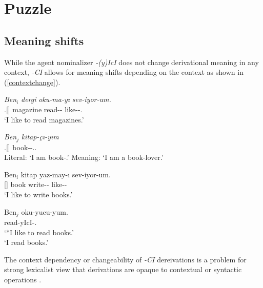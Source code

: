 \section{Puzzle}
    \subsection{Meaning shifts}
    While the agent nominalizer \textit{-(y)IcI} does not change derivational meaning in any context, \textit{-CI} allows for meaning shifts depending on the context as shown in (\ref{contextchange}).
    
    \begin{exe}
    \ex \label{contextchange}
    \begin{xlisti}
    \ex \begin{xlista}
    \ex \label{speakerA} \gll \textit{Ben}$_i$ \textit{dergi} \textit{oku-ma-yı} \textit{sev-iyor-um.} \\ {\First}.{\Sg}[{\Nom}] magazine read-{\Nmlz}-{\Acc} like-{\Prog}-{\First}.{\Sg} \\
    \glt `I like to read magazines.'

    \ex \label{speakerB} \gll \textit{Ben}$_j$ \textit{kitap-çı-yım} \\ {\First}.{\Sg}[{\Nom}] book-{\Ci}-{\Cop}.{\First}.{\Sg} \\
    \glt Literal: `I am book-{\Ci}.'
    Meaning: `I am a book-lover.'
    \end{xlista}
    
    \ex \begin{xlista}
    \ex \gll Ben$_i$ kitap yaz-may-ı sev-iyor-um. \\ {\Fsg}[{\Nom}] book write-{\Nmlz}-{\Acc} like-{\Prog}-{\Fsg} \\
    \glt `I like to write books.' 
    
    \ex \gll Ben$_j$ oku-yucu-yum. \\ {\Fsg} read-yIcI-{\Cop}.{\Fsg} \\
    \glt `*I like to read books.' \\ `I read books.' 
    
    \end{xlista}
    \end{xlisti}
    \end{exe}
The context dependency or changeability of \textit{-CI} dereivations is a problem for strong lexicalist view that derivations are opaque to contextual or syntactic operations \citep{bresnan1995lexical}.
 

